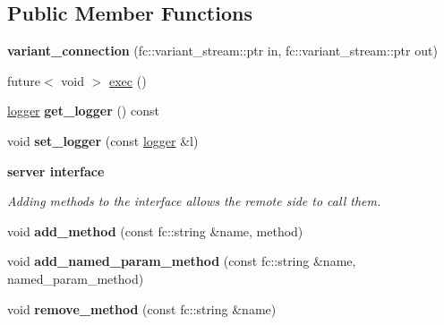 \subsection*{Public Member Functions}
\begin{DoxyCompactItemize}
\item 
\mbox{\label{classfc_1_1rpc_1_1variant__connection_a7dcf56819720969b6282fbfeee251d12}} 
{\bfseries variant\+\_\+connection} (fc\+::variant\+\_\+stream\+::ptr in, fc\+::variant\+\_\+stream\+::ptr out)
\item 
future$<$ void $>$ \mbox{\hyperlink{classfc_1_1rpc_1_1variant__connection_ac5707f1d0255a96589c879c3590a7209}{exec}} ()
\item 
\mbox{\label{classfc_1_1rpc_1_1variant__connection_afe170e532e723b85cf1ce04aea6c2f07}} 
\mbox{\hyperlink{classfc_1_1logger}{logger}} {\bfseries get\+\_\+logger} () const
\item 
\mbox{\label{classfc_1_1rpc_1_1variant__connection_a735c4767c8dac8c031e4357cb58b1415}} 
void {\bfseries set\+\_\+logger} (const \mbox{\hyperlink{classfc_1_1logger}{logger}} \&l)
\end{DoxyCompactItemize}
\begin{Indent}\textbf{ server interface}\par
{\em Adding methods to the interface allows the remote side to call them. }\begin{DoxyCompactItemize}
\item 
\mbox{\label{classfc_1_1rpc_1_1variant__connection_a71c8d29d5cf05a15ebadb738872ca5d3}} 
void {\bfseries add\+\_\+method} (const fc\+::string \&name, method)
\item 
\mbox{\label{classfc_1_1rpc_1_1variant__connection_a11760f540bae1070466340e390e5f659}} 
void {\bfseries add\+\_\+named\+\_\+param\+\_\+method} (const fc\+::string \&name, named\+\_\+param\+\_\+method)
\item 
\mbox{\label{classfc_1_1rpc_1_1variant__connection_ad963e6712a340ab11b4df5411c3b9f61}} 
void {\bfseries remove\+\_\+method} (const fc\+::string \&name)
\end{DoxyCompactItemize}
\end{Indent}
